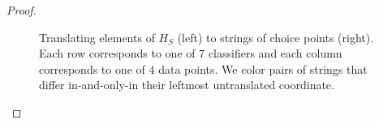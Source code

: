 \documentclass[twocolumn, 11pt]{article}
\theoremstyle{definition}
\begin{document}
\begin{proof}
            \begin{figure}[H]
                \centering
                \caption{
                    Translating elements of $H_S$ (left) to strings of choice
                    points (right).  Each row corresponds to one of $7$ classifiers
                    and each column corresponds to one of $4$ data points.
                    We color pairs of strings that differ in-and-only-in their
                    leftmost untranslated coordinate.
                }
                \label{fig:sauer}
            \end{figure}


\end{proof}
\end{document}
